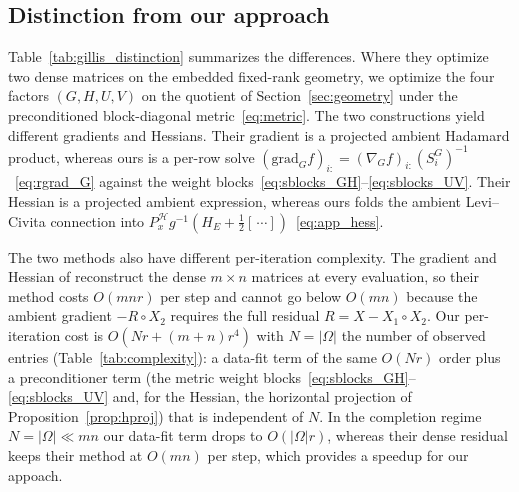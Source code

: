 \documentclass[letterpaper, 10 pt, conference]{ieeeconf}
\newcommand{\cH}{\mathcal{H}}
\newcommand{\Had}{\circ}
\theoremstyle{plain}
\theoremstyle{definition}
\theoremstyle{remark}
\begin{document}
\subsection{Distinction from our approach}
Table~\ref{tab:gillis_distinction} summarizes the differences. Where they optimize two dense matrices on the embedded fixed-rank geometry, we optimize the four factors $(G,H,U,V)$ on the quotient of Section~\ref{sec:geometry} under the preconditioned block-diagonal metric~\eqref{eq:metric}. The two constructions yield different gradients and Hessians. Their gradient is a projected ambient Hadamard product, whereas ours is a per-row solve $(\mathrm{grad}_G f)_{i:}=(\nabla_G f)_{i:}(S_i^G)^{-1}$~\eqref{eq:rgrad_G} against the weight blocks~\eqref{eq:sblocks_GH}--\eqref{eq:sblocks_UV}. Their Hessian is a projected ambient expression, whereas ours folds the ambient Levi--Civita connection into $P_x^{\cH}g^{-1}(H_E+\tfrac12[\,\cdots])$~\eqref{eq:app_hess}.


The two methods also have different per-iteration complexity. The gradient and Hessian of \citet{gillis2026manifold} reconstruct the dense $m\times n$ matrices at every evaluation, so their method costs $O(mnr)$ per step and cannot go below $O(mn)$ because the ambient gradient $-R\Had X_2$ requires the full residual $R=X-X_1\Had X_2$. Our per-iteration cost is $O(Nr + (m{+}n)r^4)$ with $N=|\Omega|$ the number of observed entries (Table~\ref{tab:complexity}): a data-fit term of the same $O(Nr)$ order plus a preconditioner term (the metric weight blocks~\eqref{eq:sblocks_GH}--\eqref{eq:sblocks_UV} and, for the Hessian, the horizontal projection of Proposition~\ref{prop:hproj}) that is independent of $N$. In the completion regime $N=|\Omega|\ll mn$ our data-fit term drops to $O(|\Omega|r)$, whereas their dense residual keeps their method at $O(mn)$ per step, which provides a speedup for our appoach.






\end{document}
